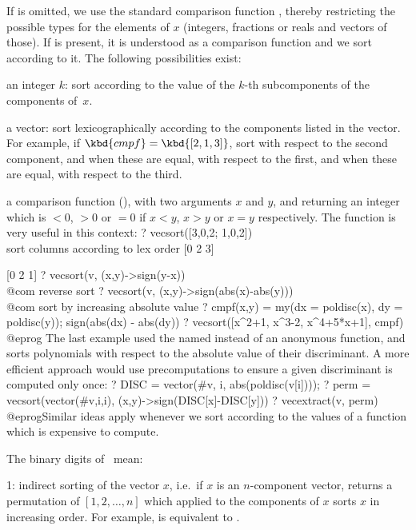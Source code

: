 If  is omitted, we use the standard comparison function
, thereby restricting the possible types for the elements of $x$
(integers, fractions or reals and vectors of those). If  is
present, it is understood as a comparison function and we sort according to
it. The following possibilities exist:

\item an integer $k$: sort according to the value of the $k$-th
subcomponents of the components of~$x$.

\item a vector: sort lexicographically according to the components listed in
the vector. For example, if $\kbd{cmpf}=\kbd{[2,1,3]}$, sort with respect to
the second component, and when these are equal, with respect to the first,
and when these are equal, with respect to the third.

\item a comparison function (), with two arguments $x$ and $y$,
and returning an integer which is $<0$, $>0$ or $=0$ if $x<y$, $x>y$ or
$x=y$ respectively. The  function is very useful in this context:
\bprog
? vecsort([3,0,2; 1,0,2]) \\ sort columns according to lex order
[0 2 3]

[0 2 1]
? vecsort(v, (x,y)->sign(y-x))            \\@com reverse sort
? vecsort(v, (x,y)->sign(abs(x)-abs(y)))  \\@com sort by increasing absolute value
? cmpf(x,y) = my(dx = poldisc(x), dy = poldisc(y)); sign(abs(dx) - abs(dy))
? vecsort([x^2+1, x^3-2, x^4+5*x+1], cmpf)
@eprog\noindent
The last example used the named  instead of an anonymous function,
and sorts polynomials with respect to the absolute value of their
discriminant. A more efficient approach would use precomputations to ensure
a given discriminant is computed only once:
\bprog
? DISC = vector(#v, i, abs(poldisc(v[i])));
? perm = vecsort(vector(#v,i,i), (x,y)->sign(DISC[x]-DISC[y]))
? vecextract(v, perm)
@eprog\noindent Similar ideas apply whenever we sort according to the values
of a function which is expensive to compute.

\noindent The binary digits of \fl\ mean:

\item 1: indirect sorting of the vector $x$, i.e.~if $x$ is an
$n$-component vector, returns a permutation of $[1,2,\dots,n]$ which
applied to the components of $x$ sorts $x$ in increasing order.
For example,  is equivalent to
.

